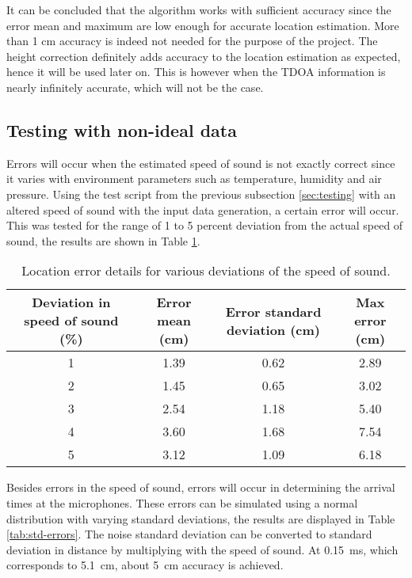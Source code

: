 \documentclass[final]{scrreprt} %
\begin{document}
It can be concluded that the algorithm works with sufficient accuracy since the error mean and maximum are low enough for accurate location estimation.
More than 1 cm accuracy is indeed not needed for the purpose of the project.
The height correction definitely adds accuracy to the location estimation as expected, hence it will be used later on.
This is however when the TDOA information is nearly infinitely accurate, which will not be the case.

\subsection{Testing with non-ideal data}
Errors will occur when the estimated speed of sound is not exactly correct since it varies with environment parameters such as temperature, humidity and air pressure.
Using the test script from the previous subsection \ref{sec:testing} with an altered speed of sound with the input data generation, a certain error will occur.
This was tested for the range of 1 to 5 percent deviation from the actual speed of sound, the results are shown in Table \ref{tab:c-errors}.

\begin{table} [H]
\centering
	\begin{tabular}{ c | c | c | c }
  	Deviation in speed of sound (\%) & Error mean (cm) & Error standard deviation (cm) & Max error (cm) \\ \hline
  	1 & 1.39 & 0.62 & 2.89 \\
	2 & 1.45 & 0.65 & 3.02 \\
	3 & 2.54 & 1.18 & 5.40 \\
	4 & 3.60 & 1.68 & 7.54 \\
  	5 & 3.12 & 1.09 & 6.18 \\
	\end{tabular}
\caption{Location error details for various deviations of the speed of sound.}
\label{tab:c-errors}
\end{table}

Besides errors in the speed of sound, errors will occur in determining the arrival times at the microphones.
These errors can be simulated using a normal distribution with varying standard deviations, the results are displayed in Table \ref{tab:std-errors}.
The noise standard deviation can be converted to standard deviation in distance by multiplying with the speed of sound.
At \SI{0.15}{\milli\second}, which corresponds to \SI{5.1}{\centi\metre}, about \SI{5}{\centi\metre} accuracy is achieved.
\end{document}
